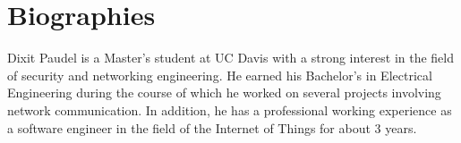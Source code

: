 \section{Biographies}

Dixit Paudel is a Master's student at UC Davis with a strong interest in the field of security and networking engineering. He earned his Bachelor’s in Electrical Engineering during the course of which he worked on several
projects involving network communication. In addition, he has a professional working experience as a software engineer in the field of the Internet of Things for about 3 years. 